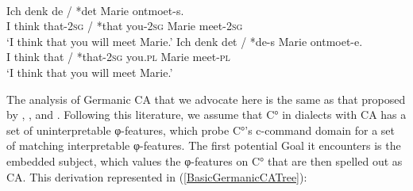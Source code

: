 \ea \label{TegelenDutch} \label{TegelenDutchBasic}
 \\
\begin{xlist}
\ex 
\gll Ich denk de / *det  Marie ontmoet-s.\\
I think that-2\textsc{sg} / *that you-2\textsc{sg} Marie meet-2\textsc{sg} \\
\glt `I think that you will meet Marie.'					
\ex 
\gll Ich denk det\circled{-\O} / *de-s  Marie ontmoet-e. \\
I think that / *that-2\textsc{sg} you.\textsc{pl} Marie meet-\textsc{pl} \\
\glt `I think that you will meet Marie.'	 
\end{xlist}
\z
\noindent The analysis of Germanic CA that we advocate here is the same as that proposed by \citet{Carstens:2003}, \citet{vanKoppen:2005}, and \citet{Haegeman:2012}. Following this literature, we assume that C° in dialects with CA has a set of uninterpretable φ-features, which probe C°’s c-command domain for a set of matching interpretable φ-features. The first potential Goal it encounters is the embedded subject, which values the φ-features on C° that are then spelled out as CA. This derivation represented in (\ref{BasicGermanicCATree}):


